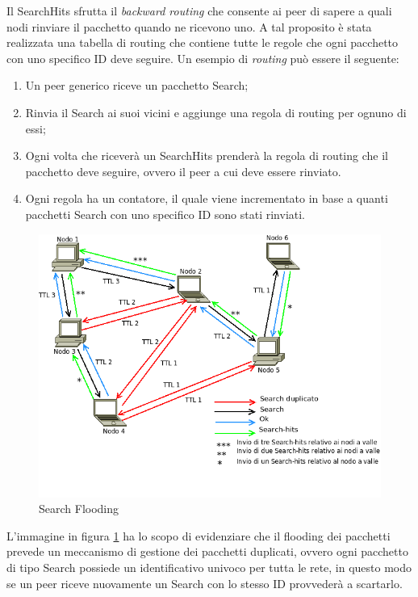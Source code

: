 Il SearchHits sfrutta il \textit{backward routing} che consente ai peer di sapere a quali nodi rinviare il pacchetto quando ne ricevono uno. A tal proposito è stata realizzata una tabella di routing che contiene tutte le regole che ogni pacchetto con uno specifico ID deve seguire.
Un esempio di \textit{routing} può essere il seguente:
\begin{enumerate}
\item Un peer generico riceve un pacchetto Search;
\item Rinvia il Search ai suoi vicini e aggiunge una regola di routing per ognuno di essi;
\item Ogni volta che riceverà un SearchHits prenderà la regola di routing che il pacchetto deve seguire, ovvero il peer a cui deve essere rinviato.
\item Ogni regola ha un contatore, il quale viene incrementato in base a quanti pacchetti Search con uno specifico ID sono stati rinviati.
\end{enumerate}
\begin{figure}[H]
\begin{center}
\includegraphics[scale=0.5]{etc/Search_overlay.png}
\caption{Search Flooding}
\label{searchoverlay}
\end{center}
\end{figure}
L'immagine in figura \ref{searchoverlay} ha lo scopo di evidenziare che il flooding dei pacchetti prevede un meccanismo di gestione dei pacchetti duplicati, ovvero ogni pacchetto di tipo Search possiede un identificativo univoco per tutta le rete, in questo modo se un peer riceve nuovamente un Search con lo stesso ID provvederà a scartarlo.
